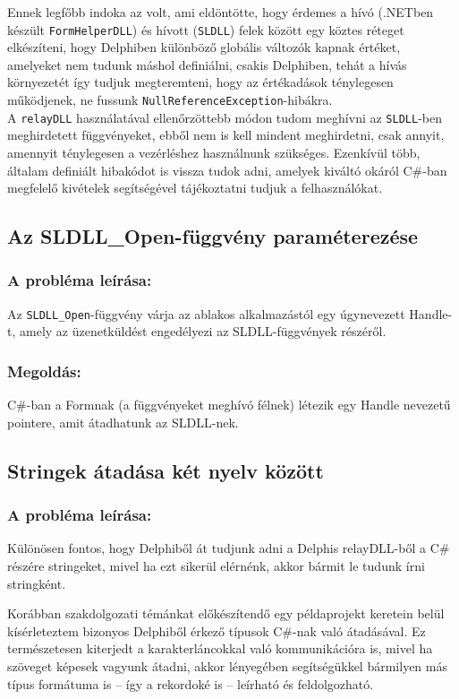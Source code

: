 \documentclass[tocnopagenum]{thesis-ekf}
\theoremstyle{definition}
\theoremstyle{remark}
\begin{document}
	Ennek legfőbb indoka az volt, ami eldöntötte, hogy érdemes a hívó (.NETben készült \verb*|FormHelperDLL|) és hívott (\verb*|SLDLL|) felek között egy köztes réteget elkészíteni, hogy Delphiben különböző globális változók kapnak értéket, amelyeket nem tudunk máshol definiálni, csakis Delphiben, tehát a hívás környezetét így tudjuk megteremteni, hogy az értékadások ténylegesen működjenek, ne fussunk \verb*|NullReferenceException|-hibákra.\\
	
	A \verb*|relayDLL| használatával ellenőrzöttebb módon tudom meghívni az \verb*|SLDLL|-ben meghirdetett függvényeket, ebből nem is kell mindent meghirdetni, csak annyit, amennyit ténylegesen a vezérléshez használnunk szükséges. Ezenkívül több, általam definiált hibakódot is vissza tudok adni, amelyek kiváltó okáról C\#-ban megfelelő kivételek segítségével tájékoztatni tudjuk a felhasználókat.
	\subsection{Az SLDLL\_Open-függvény paraméterezése}
	\subsubsection{A probléma leírása:} Az \verb*|SLDLL_Open|-függvény várja az ablakos alkalmazástól egy úgynevezett Handle-t, amely az üzenetküldést engedélyezi az SLDLL-függvények részéről.
	\subsubsection{Megoldás: } C\#-ban a Formnak (a függvényeket meghívó félnek) létezik egy Handle nevezetű pointere, amit átadhatunk az SLDLL-nek.
	\subsection{Stringek átadása két nyelv között}
	\subsubsection{A probléma leírása:} Különösen fontos, hogy Delphiből át tudjunk adni a Delphis relayDLL-ből a C\# részére stringeket, mivel ha ezt sikerül elérnénk, akkor bármit le tudunk írni stringként.
	
	Korábban szakdolgozati témánkat előkészítendő egy példaprojekt keretein belül kísérleteztem bizonyos Delphiből érkező típusok C\#-nak való átadásával. Ez természetesen kiterjedt a karakterláncokkal való kommunikációra is, mivel ha szöveget képesek vagyunk átadni, akkor lényegében segítségükkel bármilyen más típus formátuma is -- így a rekordoké is -- leírható és feldolgozható.
	
\end{document}
